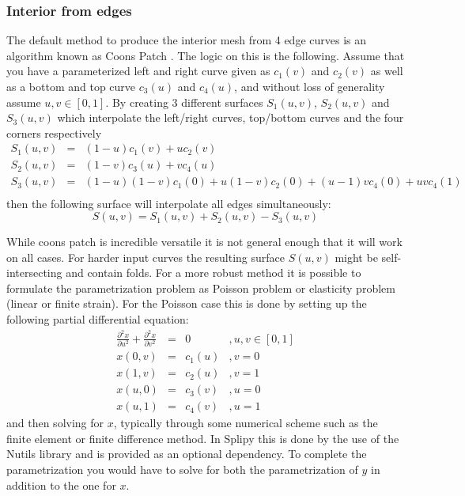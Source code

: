 \documentclass[preprint,12pt, a4paper]{elsarticle}
\begin{document}
\subsubsection{Interior from edges}
\label{sec:interior-from-edges}
The default method to produce the interior mesh from 4 edge curves is an algorithm known as Coons Patch \cite{coons1967sfc}. The logic on this is the following. Assume that you have a parameterized left and right curve given as $c_1(v)$ and $c_2(v)$ as well as a bottom and top curve $c_3(u)$ and $c_4(u)$, and without loss of generality assume $u,v\in[0,1]$. By creating 3 different surfaces $S_1(u,v)$, $S_2(u,v)$ and $S_3(u,v)$ which interpolate the left/right curves, top/bottom curves and the four corners respectively
\begin{eqnarray*}
    S_1(u,v) & = & (1-u)c_1(v) + uc_2(v) \\
    S_2(u,v) & = & (1-v)c_3(u) + vc_4(u) \\
    S_3(u,v) & = & (1-u)(1-v)c_1(0) + u(1-v)c_2(0) + (u-1)vc_4(0) + uvc_4(1) \\
\end{eqnarray*}
then the following surface will interpolate all edges simultaneously:
\begin{equation}
    S(u,v)   = S_1(u,v) + S_2(u,v) - S_3(u,v)
\end{equation}

While coons patch is incredible versatile it is not general enough that it will work on all cases.
For harder input curves the resulting surface $S(u,v)$ might be self-intersecting and contain folds.
For a more robust method it is possible to formulate the parametrization problem as Poisson problem or elasticity problem (linear or finite strain).
For the Poisson case this is done by setting up the following partial differential equation:
\begin{equation}
    \begin{array}{rcll}
    \frac{\partial^2 x}{\partial u^2} + \frac{\partial^2 x}{\partial v^2} & = & 0 &, u,v\in [0,1] \\
    x(0,v) & = & c_1(u) &, v = 0 \\
    x(1,v) & = & c_2(u) &, v = 1 \\
    x(u,0) & = & c_3(v) &, u = 0 \\
    x(u,1) & = & c_4(v) &, u = 1
    \end{array}
\end{equation}
and then solving for $x$, typically through some numerical scheme such as the finite element or finite difference method.
In Splipy this is done by the use of the Nutils library \cite{van_zwieten2018n} and is provided as an optional dependency.
To complete the parametrization you would have to solve for both the parametrization of $y$ in addition to the one for $x$.
\end{document}

